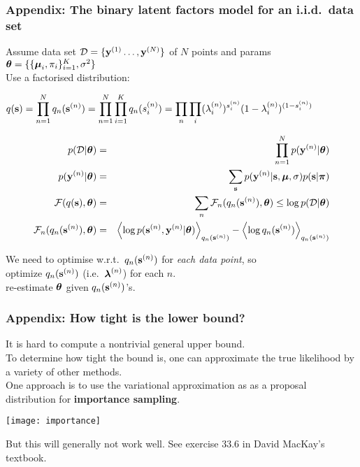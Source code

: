\begin{frame}
\frametitle{Appendix: The binary latent factors model for an i.i.d.\ data set}

\vspace*{-1ex}
Assume data set ${\cal D}=\{ \mathbf y^{(1)} \ldots, \mathbf y^{(N)}\}$ of $N$
points and params $\boldsymbol{\theta}=\{ \{ {\boldsymbol{\mu}}_i, \pi_i\}_{i=1}^K,
\sigma^2\}$ \\[1ex]
Use a factorised distribution: \\[1ex]
\centerline{$\displaystyle q(\mathbf s)=\prod_{n=1}^N q_n(\mathbf s^{(n)}) = 
\prod_{n=1}^N \prod_{i=1}^K q_n(s_{i}^{(n)}) = \prod_{n} \prod_{i} (\lambda^{(n)}_i)^{s_i^{(n)}} (1-\lambda^{(n)}_i)^{(1-s_i^{(n)})}$}

\vspace*{-2ex}
\begin{eqnarray*}
p({\cal D}|\boldsymbol{\theta})&=&\prod_{n=1}^N p(\mathbf y^{(n)}|\boldsymbol{\theta})\\
p(\mathbf y^{(n)}|\boldsymbol{\theta}) &=& \sum_{\mathbf s} p(\mathbf y^{(n)}|\mathbf s,{\boldsymbol{\mu}},\sigma)
p(\mathbf s|\boldsymbol{\pi})\\
{\cal F}(q(\mathbf s),\boldsymbol{\theta}) &=& \sum_n {\cal
  F}_n(q_n(\mathbf s^{(n)}),\boldsymbol{\theta}) \le \log p({\cal D}|\boldsymbol{\theta}) \\
{\cal F}_n(q_n(\mathbf s^{(n)}),\boldsymbol{\theta}) &=& \left\langle \log p(\mathbf s^{(n)}, \mathbf y^{(n)}|\boldsymbol{\theta}) \right\rangle_{q_n(\mathbf s^{(n)})} -
\left\langle \log q_n(\mathbf s^{(n)}) \right\rangle_{q_n(\mathbf s^{(n)})}
\end{eqnarray*} 

We need to optimise w.r.t.\ $q_n(\mathbf s^{(n)})$ for
{\em each data point}, so \\

 optimize $q_n(\mathbf s^{(n)})$ (i.e.\ $\boldsymbol{\lambda}^{(n)}$) for each $n$.\\
 re-estimate $\boldsymbol{\theta}$ given  $q_n(\mathbf s^{(n)})$'s. 

\end{frame}
\begin{frame}
\frametitle{Appendix: How tight is the lower bound?}
 
It is hard to compute a nontrivial general upper bound. \\[1ex]

To determine how tight the bound is, one can approximate the true
likelihood by a variety of other methods. \\[1ex]

One approach is to use the variational approximation as as a proposal
distribution for {\bf importance sampling}.

\begin{center}
\texttt{[image: importance]}
\end{center}

\vspace{0.1in}
But this will generally not work well. See exercise 33.6 in David
MacKay's textbook. 

\end{frame}

